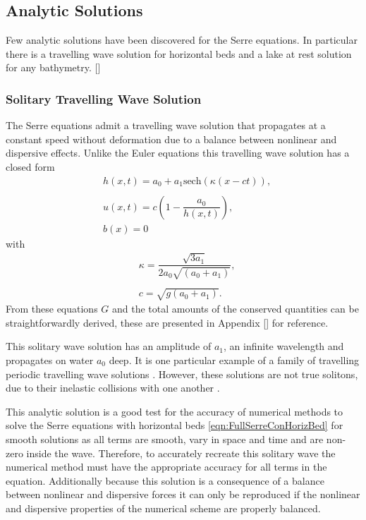 \subsection{Analytic Solutions}
Few analytic solutions have been discovered for the Serre equations. In particular there is a travelling wave solution for horizontal beds and a lake at rest solution for any bathymetry.
[]

\subsubsection{Solitary Travelling Wave Solution}
The Serre equations admit a travelling wave solution that propagates at a constant speed without deformation due to a balance between nonlinear and dispersive effects. Unlike the Euler equations this travelling wave solution has a closed form
\begin{subequations}
	\begin{align}
	&h(x,t) = a_0 + a_1\text{sech}\left(\kappa \left(x - ct\right)\right), \\  \nonumber \\
	&u(x,t) = c\left(1 - \dfrac{a_0}{h(x,t)}\right), \\
	&b(x) = 0
	\end{align}
	\label{eqn:Solitondefhub}
\end{subequations}
with
\begin{align*}
&\kappa = \dfrac{\sqrt{3a_1}}{2 a_0\sqrt{\left(a_0 + a_1\right)}}, \\ \\
&c = \sqrt{g(a_0 + a_1)}.
\end{align*}
From these equations $G$ and the total amounts of the conserved quantities can be straightforwardly derived, these are presented in Appendix [] for reference. 

This solitary wave solution has an amplitude of $a_1$, an infinite wavelength and propagates on water $a_0$ deep. It is one particular example of a family of travelling periodic travelling wave solutions \cite{El-etal-2006}. However, these solutions are not true solitons, due to their inelastic collisions with one another \cite{Dutykh-etal-2013-761}. 

This analytic solution is a good test for the accuracy of numerical methods to solve the Serre equations with horizontal beds \eqref{eqn:FullSerreConHorizBed} for smooth solutions as all terms are smooth, vary in space and time and are non-zero inside the wave. Therefore, to accurately recreate this solitary wave the numerical method must have the appropriate accuracy for all terms in the equation. Additionally because this solution is a consequence of a balance between nonlinear and dispersive forces it can only be reproduced if the nonlinear and dispersive properties of the numerical scheme are properly balanced.

